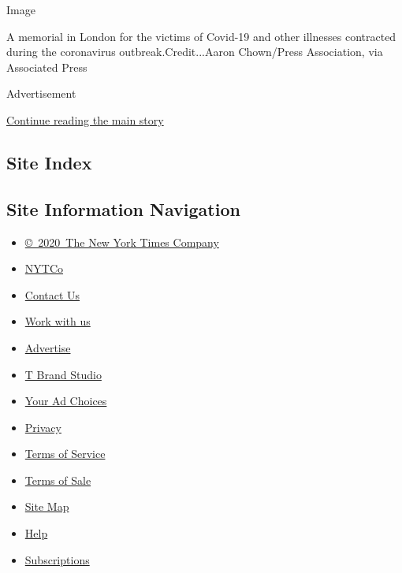 Image

A memorial in London for the victims of Covid-19 and other illnesses
contracted during the coronavirus outbreak.Credit...Aaron Chown/Press
Association, via Associated Press

Advertisement

\protect\hyperlink{after-bottom}{Continue reading the main story}

\hypertarget{site-index}{%
\subsection{Site Index}\label{site-index}}

\hypertarget{site-information-navigation}{%
\subsection{Site Information
Navigation}\label{site-information-navigation}}

\begin{itemize}
\tightlist
\item
  \href{https://help.nytimes.com/hc/en-us/articles/115014792127-Copyright-notice}{©~2020~The
  New York Times Company}
\end{itemize}

\begin{itemize}
\tightlist
\item
  \href{https://www.nytco.com/}{NYTCo}
\item
  \href{https://help.nytimes.com/hc/en-us/articles/115015385887-Contact-Us}{Contact
  Us}
\item
  \href{https://www.nytco.com/careers/}{Work with us}
\item
  \href{https://nytmediakit.com/}{Advertise}
\item
  \href{http://www.tbrandstudio.com/}{T Brand Studio}
\item
  \href{https://www.nytimes.com/privacy/cookie-policy\#how-do-i-manage-trackers}{Your
  Ad Choices}
\item
  \href{https://www.nytimes.com/privacy}{Privacy}
\item
  \href{https://help.nytimes.com/hc/en-us/articles/115014893428-Terms-of-service}{Terms
  of Service}
\item
  \href{https://help.nytimes.com/hc/en-us/articles/115014893968-Terms-of-sale}{Terms
  of Sale}
\item
  \href{https://spiderbites.nytimes.com}{Site Map}
\item
  \href{https://help.nytimes.com/hc/en-us}{Help}
\item
  \href{https://www.nytimes.com/subscription?campaignId=37WXW}{Subscriptions}
\end{itemize}
